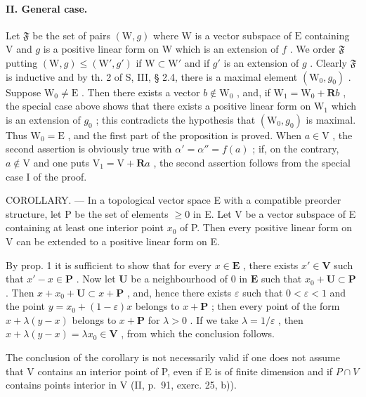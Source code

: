 \paragraph{II. General case.}

Let \(\mathfrak{F}\) be the set of pairs \((\mathrm{W}, g)\) where \(\mathrm{W}\) is a vector subspace of \(\mathrm{E}\) containing \(\mathrm{V}\) and \(g\) is a positive linear form on \(\mathrm{W}\) which is an extension of \(f\) . We order \(\mathfrak{F}\) putting \((\mathrm{W}, g) \leqslant (\mathrm{W}', g')\) if \(\mathrm{W} \subset \mathrm{W}'\) and if \(g'\) is an extension of \(g\) . Clearly \(\mathfrak{F}\) is inductive and by th. 2 of S, III, § 2.4, there is a maximal element \((\mathrm{W}_0, g_0)\) . Suppose \(\mathrm{W}_0 \neq \mathrm{E}\) . Then there exists a vector \(b \notin \mathrm{W}_0\) , and, if \(\mathrm{W}_1 = \mathrm{W}_0 + \mathbf{R}b\) , the special case above shows that there exists a positive linear form on \(\mathrm{W}_1\) which is an extension of \(g_0\) ; this contradicts the hypothesis that \((\mathrm{W}_0, g_0)\) is maximal. Thus \(\mathrm{W}_0 = \mathrm{E}\) , and the first part of the proposition is proved. When \(a \in \mathrm{V}\) , the second assertion is obviously true with \(\alpha' = \alpha'' = f(a)\) ; if, on the contrary, \(a \notin \mathrm{V}\) and one puts \(\mathrm{V}_1 = \mathrm{V} + \mathbf{R}a\) , the second assertion follows from the special case I of the proof.

COROLLARY. --- In a topological vector space E with a compatible preorder structure, let P be the set of elements \(\geqslant 0\) in E. Let V be a vector subspace of E containing at least one interior point \(x_{0}\) of P. Then every positive linear form on V can be extended to a positive linear form on E.

By prop. 1 it is sufficient to show that for every \(x \in \mathbf{E}\) , there exists \(x' \in \mathbf{V}\) such that \(x' - x \in \mathbf{P}\) . Now let \(\mathbf{U}\) be a neighbourhood of 0 in \(\mathbf{E}\) such that \(x_0 + \mathbf{U} \subset \mathbf{P}\) . Then \(x + x_0 + \mathbf{U} \subset x + \mathbf{P}\) , and, hence there exists \(\varepsilon\) such that \(0 < \varepsilon < 1\) and the point \(y = x_0 + (1 - \varepsilon)x\) belongs to \(x + \mathbf{P}\) ; then every point of the form \(x + \lambda(y - x)\) belongs to \(x + \mathbf{P}\) for \(\lambda > 0\) . If we take \(\lambda = 1 / \varepsilon\) , then \(x + \lambda(y - x) = \lambda x_0 \in \mathbf{V}\) , from which the conclusion follows.

The conclusion of the corollary is not necessarily valid if one does not assume that V contains an interior point of P, even if E is of finite dimension and if \(P \cap V\) contains points interior in V (II, p.~91, exerc. 25, b)).
\relax{}
